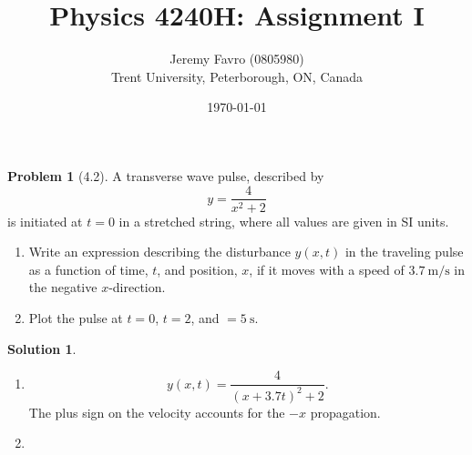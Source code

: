\documentclass[10pt]{article}
\title{Physics 4240H: Assignment I}
\author{Jeremy Favro (0805980) \\ Trent University, Peterborough, ON, Canada}
\date{\today}
\theoremstyle{definition}
\newtheorem{problem}{Problem}
\newtheorem{soln}{Solution}
\begin{document}
\maketitle

\begin{problem}[4.2]
A transverse wave pulse, described by
$$y=\frac{4}{x^2+2}$$
is initiated at $t=0$ in a stretched string, where all values are given in SI units.
\begin{enumerate}[label=(\alph*)]
  \item Write an expression describing the disturbance $y(x,t)$ in the traveling pulse as a function of time, $t$, and position,
        $x$, if it moves with a speed of $\qty{3.7}{\meter\per\second}$ in the negative $x$-direction.
  \item Plot the pulse at $t=0$, $t=2$, and $=\qty{5}{\second}$.
\end{enumerate}
\end{problem}
\begin{soln}~
  \begin{enumerate}[label=(\alph*)]
    \item $$y(x,t)=\frac{4}{(x+3.7t)^2+2}.$$ The plus sign on the velocity accounts for the $-x$ propagation.
    \item ~\begin{center}
          \end{center}
  \end{enumerate}
\end{soln}
\end{document}
